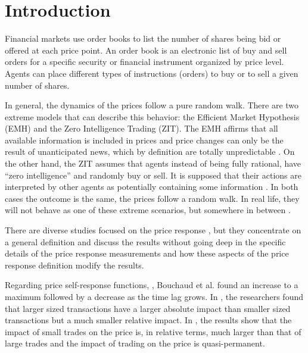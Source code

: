 \section{Introduction}\label{sec:introduction}

Financial markets use order books to list the number of shares being bid or
offered at each price point. An order book is an electronic list of buy and
sell orders for a specific security or financial instrument organized by price
level. Agents can place different types of instructions (orders) to buy or to
sell a given number of shares.

In general, the dynamics of the prices follow a pure random walk. There are two
extreme models that can describe this behavior: the Efficient Market Hypothesis
(EMH) and the Zero Intelligence Trading (ZIT). The EMH affirms that all
available information is included in prices and price changes can only be the
result of unanticipated news, which by definition are totally unpredictable
\cite{subtle_nature,Bouchaud_2004,EMH_lillo,stat_theory}. On the other hand,
the ZIT assumes that agents instead of being fully rational, have ``zero
intelligence” and randomly buy or sell. It is supposed that their actions are
interpreted by other agents as potentially containing some information
\cite{subtle_nature,Bouchaud_2004,stat_theory,Wang_2016_cross}.
In both cases the outcome is the same, the prices follow a random walk.
In real life, they will not behave as one of these extreme scenarios, but
somewhere in between \cite{Bouchaud_2004,stat_theory}.

There are diverse studies focused on the price response
\cite{dissecting_cross,r_walks_liquidity,subtle_nature,Bouchaud_2004,large_prices_changes,pow_law_dist,theory_market_impact,spread_changes_affect,master_curve,EMH_lillo,quant_stock_price_response,ori_pow_law,prop_order_book,Wang_2018_b,Wang_2018_a,Wang_2016_avg,Wang_2016_cross},
but they concentrate on a general definition and discuss the results without
going deep in the specific details of the price response measurements and how
these aspects of the price response definition modify the results.

Regarding price self-response functions,
\cite{r_walks_liquidity,subtle_nature,Bouchaud_2004}, Bouchaud et al. found
an increase to a maximum followed by a decrease as the time lag grows.
In \cite{theory_market_impact}, the researchers found that larger sized
transactions have a larger absolute impact than smaller sized transactions but
a much smaller relative impact. In \cite{prop_order_book}, the results show
that the impact of small trades on the price is, in relative terms, much larger
than that of large trades and the impact of trading on the price is
quasi-permanent.

